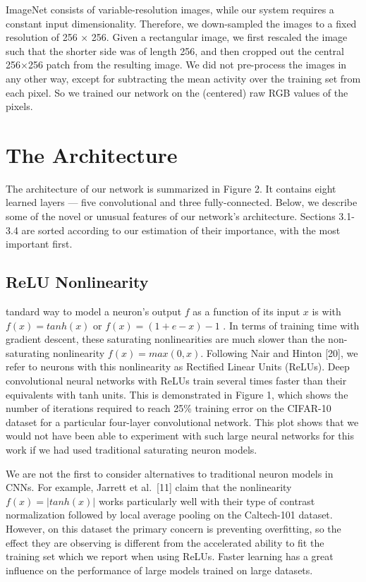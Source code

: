 \documentclass[12pt,a4paper,UTF8,twoside]{book}
\begin{document}
ImageNet consists of variable-resolution images, while our system requires a constant input dimensionality. Therefore, we down-sampled the images to a fixed resolution of 256 × 256. Given a rectangular image, we first rescaled the image such that the shorter side was of length 256, and then cropped out the central 256×256 patch from the resulting image. We did not pre-process the images in any other way, except for subtracting the mean activity over the training set from each pixel. So we trained our network on the (centered) raw RGB values of the pixels.

\hypertarget{the-architecture}{%
\section{The Architecture}\label{the-architecture}}

The architecture of our network is summarized in Figure 2. It contains eight learned layers --- five convolutional and three fully-connected. Below, we describe some of the novel or unusual features of our network's architecture. Sections 3.1-3.4 are sorted according to our estimation of their importance, with the most important first.

\hypertarget{relu-nonlinearity}{%
\subsection{ReLU Nonlinearity}\label{relu-nonlinearity}}

tandard way to model a neuron's output \(f\) as a function of its input \(x\) is with \(f(x) = tanh(x)\) or \(f(x) = (1 + e−x )−1\) . In terms of training time with gradient descent, these saturating nonlinearities are much slower than the non-saturating nonlinearity \(f(x) = max(0, x)\). Following Nair and Hinton {[}20{]}, we refer to neurons with this nonlinearity as Rectified Linear Units (ReLUs). Deep convolutional neural networks with ReLUs train several times faster than their equivalents with tanh units. This is demonstrated in Figure 1, which shows the number of iterations required to reach 25\% training error on the CIFAR-10 dataset for a particular four-layer convolutional network. This plot shows that we would not have been able to experiment with such large neural networks for this work if we had used traditional saturating neuron models.

We are not the first to consider alternatives to traditional neuron models in CNNs. For example, Jarrett et al.~{[}11{]} claim that the nonlinearity \(f(x) = |tanh(x)|\) works particularly well with their type of contrast normalization followed by local average pooling on the Caltech-101 dataset. However, on this dataset the primary concern is preventing overfitting, so the effect they are observing is different from the accelerated ability to fit the training set which we report when using ReLUs. Faster learning has a great influence on the performance of large models trained on large datasets.
\end{document}
